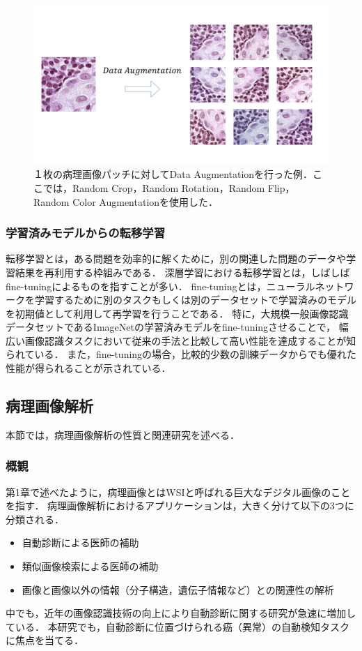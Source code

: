 \begin{figure}[tbp]
     \begin{center}
      \includegraphics[width=12cm]{figures/data_augmentation.pdf}
     \end{center}
    \caption{\label{fig:data_augmentation}１枚の病理画像パッチに対してData Augmentationを行った例．ここでは，Random Crop，Random Rotation，Random Flip，Random Color Augmentationを使用した．}
\end{figure}

\subsubsection{学習済みモデルからの転移学習}
\label{sec:transfer}
転移学習とは，ある問題を効率的に解くために，別の関連した問題のデータや学習結果を再利用する枠組みである．
深層学習における転移学習とは，しばしばfine-tuningによるものを指すことが多い．
fine-tuningとは，ニューラルネットワークを学習するために別のタスクもしくは別のデータセットで学習済みのモデルを初期値として利用して再学習を行うことである．
特に，大規模一般画像認識データセットであるImageNet\cite{imagenet_cvpr09}の学習済みモデルをfine-tuningさせることで，
幅広い画像認識タスクにおいて従来の手法と比較して高い性能を達成することが知られている\cite{girshick2014rich, agrawal2014analyzing}．
また，fine-tuningの場合，比較的少数の訓練データからでも優れた性能が得られることが示されている．

\subsection{病理画像解析}
\label{sec:path_images}
本節では，病理画像解析の性質と関連研究を述べる．

\subsubsection{概観}
第1章で述べたように，病理画像とはWSIと呼ばれる巨大なデジタル画像のことを指す．
病理画像解析におけるアプリケーションは，大きく分けて以下の3つに分類される\cite{komuraishikawa}．
\begin{itemize}
    \item 自動診断による医師の補助
    \item 類似画像検索による医師の補助
    \item 画像と画像以外の情報（分子構造，遺伝子情報など）との関連性の解析
\end{itemize}
中でも，近年の画像認識技術の向上により自動診断に関する研究が急速に増加している\cite{doyle2008automated,dundar2011computerized}．
本研究でも，自動診断に位置づけられる癌（異常）の自動検知タスクに焦点を当てる．

